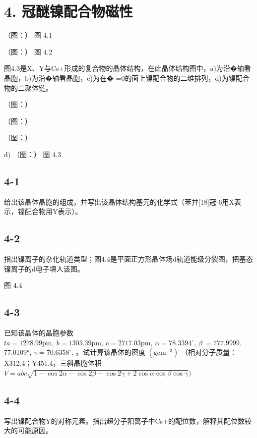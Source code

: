 \section*{4. 冠醚镍配合物磁性}
（图：）
图 4.1

（图：）
图 4.2

图4.3是X、Y与Cs+形成的复合物的晶体结构，在此晶体结构图中，a)为沿�轴看晶胞，b)为沿�轴看晶胞，c)为在� =0的⾯上镍配合物的⼆维排列，d)为镍配合物的⼆聚体链。

（图：）

（图：）

（图：）

d)
（图：）
图 4.3

\subsection*{4-1}
给出该晶体晶胞的组成，并写出该晶体结构基元的化学式（苯并[18]冠-6⽤X表⽰，镍配合物⽤Y表⽰）。

\subsection*{4-2}
指出镍离⼦的杂化轨道类型；图4.4是平⾯正⽅形晶体场d轨道能级分裂图，把基态镍离⼦的d电⼦填⼈该图。

图 4.4

\subsection*{4-3}
已知该晶体的晶胞参数 $t a = 1 2 7 8 . 9 9 \mathrm { p m } , \ b = 1 3 0 5 . 3 9 \mathrm { p m } , \ c = 2 7 1 7 . 0 3 \mathrm { p m } , \ \alpha = 7 8 . 3 3 9 4 ^ { \circ } , \ \beta \ = 7 7 7 . 9 9 9 9 .$ 77.0109°, $\gamma = 7 0 . 6 3 5 8 ^ { \circ } .$ 。试计算该晶体的密度 $\mathrm { ( g c m ^ { - 3 } ) }$ （相对分⼦质量：X312.4；Y451.4，三斜晶胞体积 $V = a b c \sqrt { 1 - \cos 2 \alpha - \cos 2 \beta - \cos 2 \gamma + 2 \cos \alpha \cos \beta \cos \gamma } )$

\subsection*{4-4}
写出镍配合物Y的对称元素。指出超分⼦阳离⼦中Cs+的配位数，解释其配位数较⼤的可能原因。
